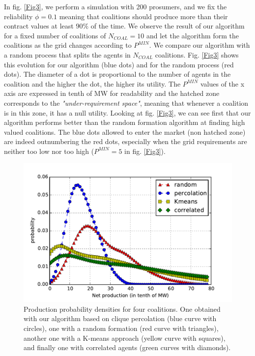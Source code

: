 \documentclass[conference]{IEEEtran}
\begin{document}
In fig. \ref{Fig3}, we perform a simulation with 200 prosumers, and we fix the reliability $ \phi = 0.1 $ meaning that coalitions should produce more than their contract values at least $ 90 \% $ of the time. We observe the result of our algorithm for a fixed number of coalitions of $N_{COAL} = 10$ and let the algorithm form the coalitions as the grid changes according to $ P^{MIN} $. We compare our algorithm with a random process that splits the agents in $ N_{COAL} $ coalitions. Fig. \ref{Fig3} shows this evolution for our algorithm (blue dots) and for the random process (red dots). The diameter of a dot is proportional to the number of agents in the coalition and the higher the dot, the higher its utility. The $ P^{MIN} $ values of the x axis are expressed in tenth of MW for readability and the hatched zone corresponds to the \textit{"under-requirement space"}, meaning that whenever a coalition is in this zone, it has a null utility. Looking at fig. \ref{Fig3}, we can see first that our algorithm performs better than the random formation algorithm at finding high valued coalitions. The blue dots allowed to enter the market (non hatched zone) are indeed outnumbering the red dots, especially when the grid requirements are neither too low nor too high ($ P^{MIN} = 5 $ in fig. \ref{Fig3}).


\begin{figure}
  \centering
  \includegraphics[scale=0.53]{./figure11/densities.pdf}
  \caption{Production probability densities for four coalitions. One obtained with our algorithm based on clique percolation (blue curve with circles), one with a random formation (red curve with triangles), another one with a K-means approach (yellow curve with squares), and finally one with correlated agents (green curves with diamonds).}
  \label{Fig5}
\end{figure}
\end{document}
